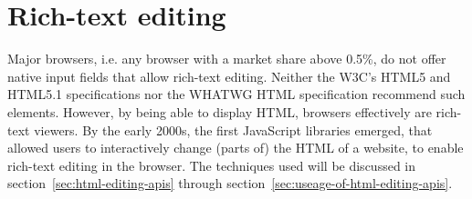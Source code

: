 \section{Rich-text editing}

Major browsers, i.e. any browser with a market share above 0.5\%\cite{ag}, do not offer native input fields that allow rich-text editing. Neither the W3C's HTML5 and HTML5.1 specifications nor the WHATWG HTML specification recommend such elements. However, by being able to display HTML, browsers effectively are rich-text viewers. By the early 2000s, the first JavaScript libraries emerged, that allowed users to interactively change (parts of) the HTML of a website, to enable rich-text editing in the browser. The techniques used will be discussed in section~\ref{sec:html-editing-apis} through section~\ref{sec:useage-of-html-editing-apis}.

